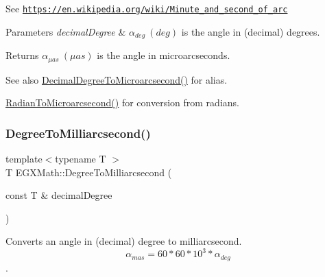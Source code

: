 See \href{https://en.wikipedia.org/wiki/Minute_and_second_of_arc}{\tt https\+://en.\+wikipedia.\+org/wiki/\+Minute\+\_\+and\+\_\+second\+\_\+of\+\_\+arc} 
\begin{DoxyParams}{Parameters}
{\em decimal\+Degree} & $\alpha_{deg}\ (deg)$ is the angle in (decimal) degrees. \\
\hline
\end{DoxyParams}
\begin{DoxyReturn}{Returns}
$\alpha_{\mu as}\ (\mu as)$ is the angle in microarcseconds. 
\end{DoxyReturn}
\begin{DoxySeeAlso}{See also}
\mbox{\hyperlink{group___e_g_x_math-_angle_conversions-_decimal_degree_ga6fa88456069907fd24716fa575517571}{Decimal\+Degree\+To\+Microarcsecond()}} for alias. 

\mbox{\hyperlink{group___e_g_x_math-_angle_conversions-_radian_ga3a515ca2838a305fa40750763f546a86}{Radian\+To\+Microarcsecond()}} for conversion from radians. 
\end{DoxySeeAlso}
\mbox{\label{group___e_g_x_math-_angle_conversions-_degree_ga2c218e286b2ef72a00734dbc5a7f5ab6}} 
\subsubsection{\texorpdfstring{Degree\+To\+Milliarcsecond()}{DegreeToMilliarcsecond()}}
{\footnotesize\ttfamily template$<$typename T $>$ \\
T E\+G\+X\+Math\+::\+Degree\+To\+Milliarcsecond (\begin{DoxyParamCaption}\item[{const T \&}]{decimal\+Degree }\end{DoxyParamCaption})}



Converts an angle in (decimal) degree to milliarcsecond. \[\alpha_{mas}=60 * 60 * 10^3 * \alpha_{deg} \]. 

